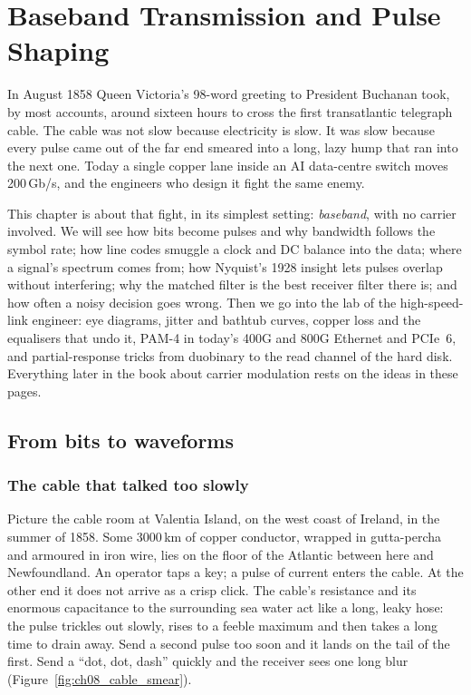 \chapter{Baseband Transmission and Pulse Shaping}
\label{ch:baseband}

\begin{chapterintro}
In August 1858 Queen Victoria's 98-word greeting to President Buchanan took, by most accounts,
around sixteen hours to cross the first transatlantic telegraph cable. The cable was not slow
because electricity is slow. It was slow because every pulse came out of the far end smeared
into a long, lazy hump that ran into the next one. Today a single copper lane inside an AI
data-centre switch moves 200\,Gb/s, and the engineers who design it fight the same enemy.

This chapter is about that fight, in its simplest setting: \emph{baseband}, with no carrier
involved. We will see how bits become pulses and why bandwidth follows the symbol rate; how
line codes smuggle a clock and DC balance into the data; where a signal's spectrum comes
from; how Nyquist's 1928 insight lets pulses overlap without interfering; why the matched
filter is the best receiver filter there is; and how often a noisy decision goes wrong. Then
we go into the lab of the high-speed-link engineer: eye diagrams, jitter and bathtub curves,
copper loss and the equalisers that undo it, PAM-4 in today's 400G and 800G Ethernet and
PCIe~6, and partial-response tricks from duobinary to the read channel of the hard disk.
Everything later in the book about carrier modulation rests on the ideas in these pages.
\end{chapterintro}

\section{From bits to waveforms}
\label{sec:ch08:pam}

\subsection{The cable that talked too slowly}

Picture the cable room at Valentia Island, on the west coast of Ireland, in the summer of
1858. Some 3000\,km of copper conductor, wrapped in gutta-percha and armoured in iron wire,
lies on the floor of the Atlantic between here and Newfoundland. An operator taps a key; a
pulse of current enters the cable. At the other end it does not arrive as a crisp click.
The cable's resistance and its enormous capacitance to the surrounding sea water act like a
long, leaky hose: the pulse trickles out slowly, rises to a feeble maximum and then takes a
long time to drain away. Send a second pulse too soon and it lands on the tail of the first.
Send a ``dot, dot, dash'' quickly and the receiver sees one long blur
(Figure~\ref{fig:ch08_cable_smear}).

